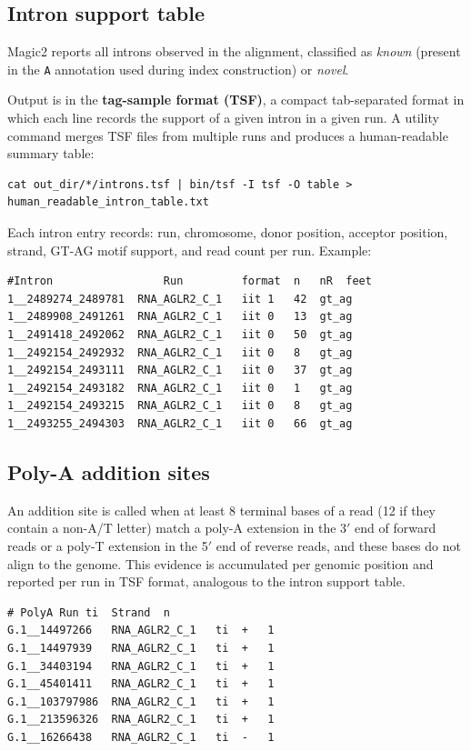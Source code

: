 \documentclass[11pt]{article}
\newcommand{\code}[1]{\texttt{#1}}
\begin{document}
\subsection{Intron support table}

Magic2 reports all introns observed in the alignment, classified as
\emph{known} (present in the \code{A} annotation used during index
construction) or \emph{novel}.

Output is in the \textbf{tag-sample format (TSF)}, a compact
tab-separated format in which each line records the support of a given intron in a given run.
A utility command merges TSF files from multiple runs and produces a
human-readable summary table:
\begin{lstlisting}
cat out_dir/*/introns.tsf | bin/tsf -I tsf -O table > human_readable_intron_table.txt
\end{lstlisting}

Each intron entry records: run, chromosome, donor position, acceptor position,
strand, GT-AG motif support, and read count per run. Example:

\begin{lstlisting}
#Intron	                Run	        format	n	nR	feet
1__2489274_2489781	RNA_AGLR2_C_1	iit	1	42	gt_ag
1__2489908_2491261	RNA_AGLR2_C_1	iit	0	13	gt_ag
1__2491418_2492062	RNA_AGLR2_C_1	iit	0	50	gt_ag
1__2492154_2492932	RNA_AGLR2_C_1	iit	0	8	gt_ag
1__2492154_2493111	RNA_AGLR2_C_1	iit	0	37	gt_ag
1__2492154_2493182	RNA_AGLR2_C_1	iit	0	1	gt_ag
1__2492154_2493215	RNA_AGLR2_C_1	iit	0	8	gt_ag
1__2493255_2494303	RNA_AGLR2_C_1	iit	0	66	gt_ag
\end{lstlisting}

\subsection{Poly-A addition sites}

An addition site is called when at least 8 terminal bases of a read
(12 if they contain a non-A/T letter) match a poly-A extension in the
3$'$ end of forward reads or a poly-T extension in the 5$'$ end of
reverse reads, and these bases do not align to the genome.  This
evidence is accumulated per genomic position and reported per run in
TSF format, analogous to the intron support table.


\begin{lstlisting}
# PolyA	Run	ti	Strand	n
G.1__14497266	RNA_AGLR2_C_1	ti	+	1
G.1__14497939	RNA_AGLR2_C_1	ti	+	1
G.1__34403194	RNA_AGLR2_C_1	ti	+	1
G.1__45401411	RNA_AGLR2_C_1	ti	+	1
G.1__103797986	RNA_AGLR2_C_1	ti	+	1
G.1__213596326	RNA_AGLR2_C_1	ti	+	1
G.1__16266438	RNA_AGLR2_C_1	ti	-	1
\end{lstlisting}
\end{document}
